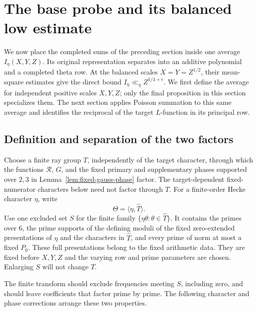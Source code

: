 \section{The base probe and its balanced low estimate}\label{sec:probe}

We now place the completed sums of the preceding section inside one
average $I_\eta(X,Y,Z)$. Its original representation separates into an
additive polynomial and a completed theta row. At the balanced scales
$X=Y=Z^{1/2}$, their mean-square estimates give the direct bound
$I_\eta\ll_\eta Z^{1/4+\epsilon}$. We first define the average for
independent positive scales $X,Y,Z$; only the final proposition in this
section specializes them. The next section applies Poisson summation to
this same average and identifies the reciprocal of the target
$L$-function in its principal row.

\subsection{Definition and separation of the two factors}

Choose a finite ray group $T$, independently of the target character,
through which the functions $\mathcal R$, $G$, and the fixed primary
and supplementary phases supported over $2,3$ in
Lemma~\ref{lem:fixed-gauss-phase} factor.  The target-dependent
fixed-numerator characters below need not factor through $T$.  For a
finite-order Hecke character $\eta$, write
\[
 \Theta=\langle\eta,\widehat T\rangle.
\]
Use one excluded set $S$ for the finite family
$\{\eta\theta:\theta\in\widehat T\}$.  It contains the primes over
$6$, the prime supports of the defining moduli of the fixed
zero-extended presentations of $\eta$ and the characters in
$\widehat T$, and every prime of norm at most a fixed $P_0$.  These
full presentations belong to the fixed arithmetic data.  They are fixed
before $X,Y,Z$ and the varying row and prime parameters are chosen.
Enlarging $S$ will not change $T$.

The finite transform should exclude frequencies meeting $S$, including
zero, and should leave coefficients that factor prime by prime. The
following character and phase corrections arrange these two properties.


